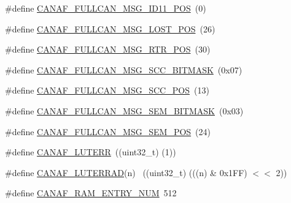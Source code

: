\begin{DoxyCompactItemize}
\item 
\#define \hyperlink{group__CAN__17XX__40XX_ga6e699ec924f45f2df91b521e21405c46}{C\+A\+N\+A\+F\+\_\+\+F\+U\+L\+L\+C\+A\+N\+\_\+\+M\+S\+G\+\_\+\+I\+D11\+\_\+\+P\+OS}~(0)
\item 
\#define \hyperlink{group__CAN__17XX__40XX_gaf748e11cd9a7e573528d510b3b1f794f}{C\+A\+N\+A\+F\+\_\+\+F\+U\+L\+L\+C\+A\+N\+\_\+\+M\+S\+G\+\_\+\+L\+O\+S\+T\+\_\+\+P\+OS}~(26)
\item 
\#define \hyperlink{group__CAN__17XX__40XX_ga99e21de5676bd992bdcd022656ad01cb}{C\+A\+N\+A\+F\+\_\+\+F\+U\+L\+L\+C\+A\+N\+\_\+\+M\+S\+G\+\_\+\+R\+T\+R\+\_\+\+P\+OS}~(30)
\item 
\#define \hyperlink{group__CAN__17XX__40XX_gaae4ad1be2ac77398fe5202385f6706a7}{C\+A\+N\+A\+F\+\_\+\+F\+U\+L\+L\+C\+A\+N\+\_\+\+M\+S\+G\+\_\+\+S\+C\+C\+\_\+\+B\+I\+T\+M\+A\+SK}~(0x07)
\item 
\#define \hyperlink{group__CAN__17XX__40XX_ga19bc4e1bae73c2b3db1144c083a3fe67}{C\+A\+N\+A\+F\+\_\+\+F\+U\+L\+L\+C\+A\+N\+\_\+\+M\+S\+G\+\_\+\+S\+C\+C\+\_\+\+P\+OS}~(13)
\item 
\#define \hyperlink{group__CAN__17XX__40XX_ga60ab049509af08d3715fb5c3a11f1b59}{C\+A\+N\+A\+F\+\_\+\+F\+U\+L\+L\+C\+A\+N\+\_\+\+M\+S\+G\+\_\+\+S\+E\+M\+\_\+\+B\+I\+T\+M\+A\+SK}~(0x03)
\item 
\#define \hyperlink{group__CAN__17XX__40XX_gad3f88ccba76ce1843fa9f20af3650c4a}{C\+A\+N\+A\+F\+\_\+\+F\+U\+L\+L\+C\+A\+N\+\_\+\+M\+S\+G\+\_\+\+S\+E\+M\+\_\+\+P\+OS}~(24)
\item 
\#define \hyperlink{group__CAN__17XX__40XX_gaed3dccb13b13c3f28089fcdd6a002869}{C\+A\+N\+A\+F\+\_\+\+L\+U\+T\+E\+RR}~((uint32\+\_\+t) (1))
\item 
\#define \hyperlink{group__CAN__17XX__40XX_ga528d730efe055217dbd17fa9757b2e8b}{C\+A\+N\+A\+F\+\_\+\+L\+U\+T\+E\+R\+R\+AD}(n)      ~((uint32\+\_\+t) (((n) \& 0x1\+F\+F) $<$$<$ 2))
\item 
\#define \hyperlink{group__CAN__17XX__40XX_ga79546dad61d5645789e339371e9f491f}{C\+A\+N\+A\+F\+\_\+\+R\+A\+M\+\_\+\+E\+N\+T\+R\+Y\+\_\+\+N\+UM}~512
\end{DoxyCompactItemize}
